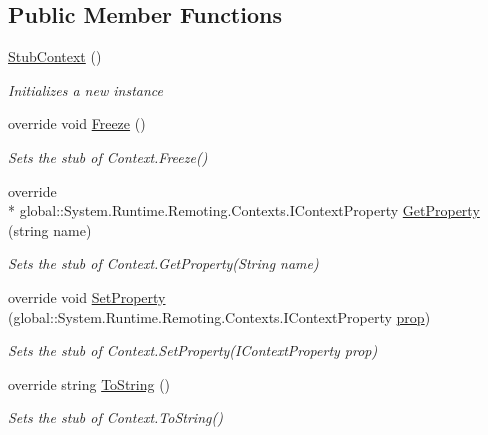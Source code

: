 \subsection*{Public Member Functions}
\begin{DoxyCompactItemize}
\item 
\hyperlink{class_system_1_1_runtime_1_1_remoting_1_1_contexts_1_1_fakes_1_1_stub_context_aec28b8a9b5ec64eff4f7149ae17808eb}{Stub\-Context} ()
\begin{DoxyCompactList}\small\item\em Initializes a new instance\end{DoxyCompactList}\item 
override void \hyperlink{class_system_1_1_runtime_1_1_remoting_1_1_contexts_1_1_fakes_1_1_stub_context_a36f2f1d0a8c31178524d59a5e1e2e3d9}{Freeze} ()
\begin{DoxyCompactList}\small\item\em Sets the stub of Context.\-Freeze()\end{DoxyCompactList}\item 
override \\*
global\-::\-System.\-Runtime.\-Remoting.\-Contexts.\-I\-Context\-Property \hyperlink{class_system_1_1_runtime_1_1_remoting_1_1_contexts_1_1_fakes_1_1_stub_context_a782e99ad41e0b220c82c7aa04822dcfe}{Get\-Property} (string name)
\begin{DoxyCompactList}\small\item\em Sets the stub of Context.\-Get\-Property(\-String name)\end{DoxyCompactList}\item 
override void \hyperlink{class_system_1_1_runtime_1_1_remoting_1_1_contexts_1_1_fakes_1_1_stub_context_ad9d13d34146998c518b4ca10fdd01e73}{Set\-Property} (global\-::\-System.\-Runtime.\-Remoting.\-Contexts.\-I\-Context\-Property \hyperlink{jquery-1_810_82-vsdoc_8js_af17be84954030af6c2286f5da385d41b}{prop})
\begin{DoxyCompactList}\small\item\em Sets the stub of Context.\-Set\-Property(\-I\-Context\-Property prop)\end{DoxyCompactList}\item 
override string \hyperlink{class_system_1_1_runtime_1_1_remoting_1_1_contexts_1_1_fakes_1_1_stub_context_a556eec1e121838cc54000a8e71ed28bb}{To\-String} ()
\begin{DoxyCompactList}\small\item\em Sets the stub of Context.\-To\-String()\end{DoxyCompactList}\end{DoxyCompactItemize}
